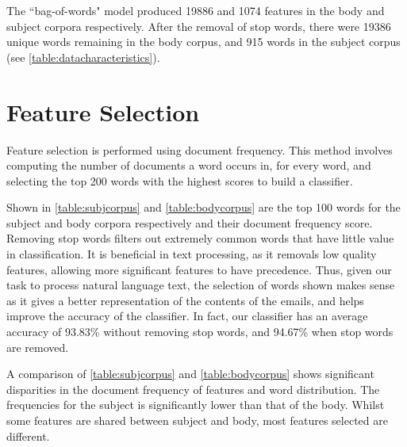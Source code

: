 \documentclass[10pt, a4paper]{article}
\begin{document}
The ``bag-of-words" model produced 19886 and 1074 features in the body and subject corpora respectively. After the removal of stop words, there were 19386 unique words remaining in the body corpus, and 915 words in the subject corpus (see \autoref{table:datacharacteristics}).

\section{Feature Selection}

Feature selection is performed using document frequency. This method involves computing the number of documents a word occurs in, for every word, and selecting the top 200 words with the highest scores to build a classifier.

Shown in \autoref{table:subjcorpus} and \autoref{table:bodycorpus} are the top 100 words for the subject and body corpora respectively and their document frequency score. Removing stop words filters out extremely common words that have little value in classification. It is beneficial in text processing, as it removals low quality features, allowing more significant features to have precedence. Thus, given our task to process natural language text, the selection of words shown makes sense as it gives a better representation of the contents of the emails, and helps improve the accuracy of the classifier. In fact, our classifier has an average accuracy of 93.83\% without removing stop words, and 94.67\% when stop words are removed.

A comparison of \autoref{table:subjcorpus} and \autoref{table:bodycorpus} shows significant disparities in the document frequency of features and word distribution. The frequencies for the subject is significantly lower than that of the body. Whilst some features are shared between subject and body, most features selected are different.
\end{document}
